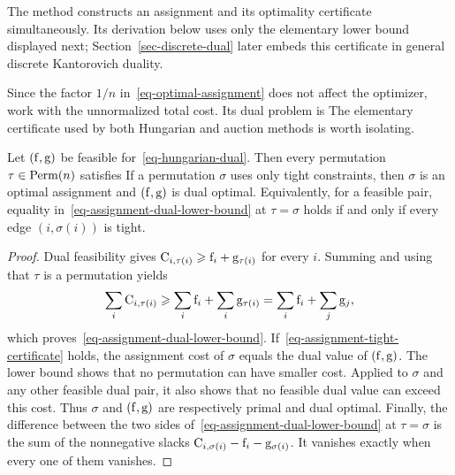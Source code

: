 The method constructs an assignment and its optimality certificate simultaneously. Its derivation below uses only the elementary lower bound displayed next; Section~\ref{sec-discrete-dual} later embeds this certificate in general discrete Kantorovich duality.

Since the factor $1/n$ in~\eqref{eq-optimal-assignment} does not affect the optimizer, work with the unnormalized total cost. Its dual problem is
The elementary certificate used by both Hungarian and auction methods is worth isolating.

\begin{prop}\label{prop-assignment-dual-certificate}
	Let $(\mathrm{f},\mathrm{g})$ be feasible for~\eqref{eq-hungarian-dual}. Then every permutation $\tau\in\mathrm{Perm}(n)$ satisfies
	If a permutation $\sigma$ uses only tight constraints,
	then $\sigma$ is an optimal assignment and $(\mathrm{f},\mathrm{g})$ is dual optimal. Equivalently, for a feasible pair, equality in~\eqref{eq-assignment-dual-lower-bound} at $\tau=\sigma$ holds if and only if every edge $(i,\sigma(i))$ is tight.
\end{prop}
\begin{proof}
	Dual feasibility gives $\mathrm{C}_{i,\tau(i)}\geqslant\mathrm{f}_i+\mathrm{g}_{\tau(i)}$ for every $i$. Summing and using that $\tau$ is a permutation yields
	\[
		\sum_i\mathrm{C}_{i,\tau(i)}
		\geqslant
		\sum_i\mathrm{f}_i+\sum_i\mathrm{g}_{\tau(i)}
		=
		\sum_i\mathrm{f}_i+\sum_j\mathrm{g}_j,
	\]
	which proves~\eqref{eq-assignment-dual-lower-bound}. If~\eqref{eq-assignment-tight-certificate} holds, the assignment cost of $\sigma$ equals the dual value of $(\mathrm{f},\mathrm{g})$. The lower bound shows that no permutation can have smaller cost. Applied to $\sigma$ and any other feasible dual pair, it also shows that no feasible dual value can exceed this cost. Thus $\sigma$ and $(\mathrm{f},\mathrm{g})$ are respectively primal and dual optimal. Finally, the difference between the two sides of~\eqref{eq-assignment-dual-lower-bound} at $\tau=\sigma$ is the sum of the nonnegative slacks $\mathrm{C}_{i,\sigma(i)}-\mathrm{f}_i-\mathrm{g}_{\sigma(i)}$. It vanishes exactly when every one of them vanishes.
\end{proof}

